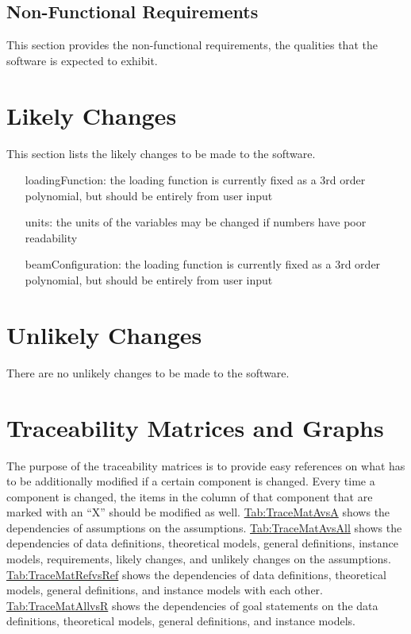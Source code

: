 \documentclass[12pt]{article}
\begin{document}
\subsection{Non-Functional Requirements}
\label{Sec:NFRs}
This section provides the non-functional requirements, the qualities that the software is expected to exhibit.

\section{Likely Changes}
\label{Sec:LCs}
This section lists the likely changes to be made to the software.

\begin{itemize}
\item[loadingFunction:\phantomsection\label{loadingFunction}]{the loading function is currently fixed as a 3rd order polynomial, but should be entirely from user input}
\item[units:\phantomsection\label{units}]{the units of the variables may be changed if numbers have poor readability}
\item[beamConfiguration:\phantomsection\label{beamConfiguration}]{the loading function is currently fixed as a 3rd order polynomial, but should be entirely from user input}
\end{itemize}
\section{Unlikely Changes}
\label{Sec:UCs}
There are no unlikely changes to be made to the software.

\section{Traceability Matrices and Graphs}
\label{Sec:TraceMatrices}
The purpose of the traceability matrices is to provide easy references on what has to be additionally modified if a certain component is changed. Every time a component is changed, the items in the column of that component that are marked with an ``X'' should be modified as well. \hyperref[Table:TraceMatAvsA]{Tab:TraceMatAvsA} shows the dependencies of assumptions on the assumptions. \hyperref[Table:TraceMatAvsAll]{Tab:TraceMatAvsAll} shows the dependencies of data definitions, theoretical models, general definitions, instance models, requirements, likely changes, and unlikely changes on the assumptions. \hyperref[Table:TraceMatRefvsRef]{Tab:TraceMatRefvsRef} shows the dependencies of data definitions, theoretical models, general definitions, and instance models with each other. \hyperref[Table:TraceMatAllvsR]{Tab:TraceMatAllvsR} shows the dependencies of goal statements on the data definitions, theoretical models, general definitions, and instance models.
\end{document}
